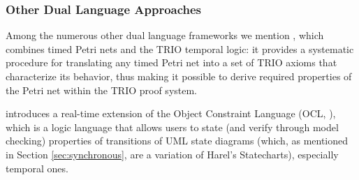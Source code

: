 \subsubsection*{Other Dual Language Approaches}
Among the numerous other dual language frameworks \cite{JM94} we mention \linebreak \cite{FMM94},
which combines timed Petri nets and the TRIO temporal logic: it provides a systematic
procedure for translating any timed Petri net into a set of TRIO axioms that characterize its 
behavior, thus making it possible to derive required properties 
of the Petri net within the TRIO proof system.

\cite{FM02} introduces a real-time extension of the Object Constraint 
Language (OCL, \cite{WK99}), which is a logic language that allows 
users to state (and verify through model checking) properties of transitions 
of UML state diagrams (which, as mentioned in Section \ref{sec:synchronous}, 
are a variation of Harel's Statecharts), especially temporal ones.

